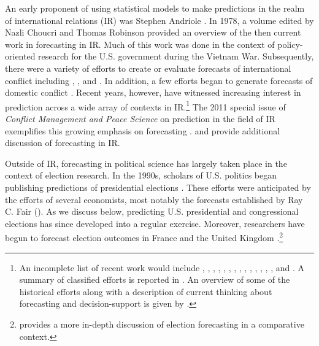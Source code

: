 \documentclass[12pt,fullpage]{article}
\newcommand{\note}[1]{\footnote{\doublespacing#1 \vspace{4 mm}}}
\begin{document}
An early proponent of using statistical models to make predictions in
the realm of international relations (IR) was Stephen Andriole
\citep{Andriole:Young:1977}. In 1978, a volume edited by Nazli Choucri
and Thomas Robinson \nocite{Choucri:Robinson:1978} provided an
overview of the then current work in forecasting in IR.  Much of this
work was done in the context of policy-oriented research for the
U.S. government during the Vietnam War.  Subsequently, there were a
variety of efforts to create or evaluate forecasts of international
conflict including \citet{Freeman:Job:1979},
\citet{Singer:Wallace:1979}, and \citet{Vincent:1980}.  In addition, a
few efforts began to generate forecasts of domestic conflict
\citep[e.g.,][]{Gurr:Lichbach:1986}.  Recent years, however, have
witnessed increasing interest in prediction across a wide array of
contexts in IR.\note{An incomplete list of recent work would include
  \citet{Krause:1997}, \citet{Davies:Gurr:1998},
  \citet{Pevehouse:Goldstein:1999}, \citet{Schrodt:Gerner:2000},
  \citet{King:Zeng:2001}, \citet{OBrien:2002}, \citet{BDM:2002},
  \citet{Fearon:Laitin:2003}, \citet{Demarchi:etal:2004},
  \citet{Enders:Sandler:2005}, \citet{Leblang:Satyanath:2006},
  \citet{Ward:etal:2007}, \citet{Brandt:etal:2008},
  \citet{Bennett:Stam:2009}, and \citet{Gleditsch:Ward:2010}. A
  summary of classified efforts is reported in \citet{Feder:2002}.  An
  overview of some of the historical efforts along with a description
  of current thinking about forecasting and decision-support is given
  by \citet{OBrien:2010}.}  The 2011 special issue of \emph{Conflict
  Management and Peace Science} on prediction in the field of IR
exemplifies this growing emphasis on forecasting
\citep[c.f.,][]{Schneider_etal_2011, Mesquita_2011,
  Brandt_etal_2011}. \citet{wgb:2010} and \citet{Greenhill:2011}
provide additional discussion of forecasting in IR.

Outside of IR, forecasting in political science has largely taken
place in the context of election research.  In the 1990s, scholars of
U.S. politics began publishing predictions of presidential elections
\citep{Campbell:1990, Campbell:1992}. These efforts were anticipated
by the efforts of several economists, most notably the forecasts
established by Ray C. Fair (\citeyear{Fair:1978}). As we discuss
below, predicting U.S. presidential and congressional elections has
since developed into a regular exercise.  Moreover, researchers have
begun to forecast election outcomes in France
\citep[e.g.,][]{Jerome:1999} and the United Kingdom
\citep[e.g.,][]{Whitely:2005}.\note{\citet{Lewis-Beck:2005} provides a
  more in-depth discussion of election forecasting in a comparative
  context.}
\end{document}
